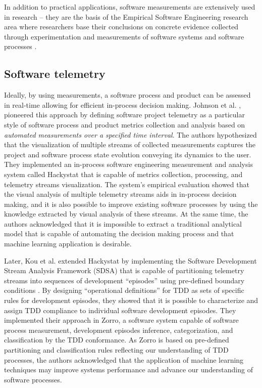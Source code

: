 In addition to practical applications, software measurements are extensively used in research --
they are the basis of the Empirical Software Engineering research area where researchers base their conclusions on 
concrete evidence collected through experimentation and measurements of software systems and software 
processes \cite{citeulike:766768}.

\subsection{Software telemetry}\label{section_software_telemetry}
Ideally, by using measurements, a software process and product can be assessed in real-time allowing for 
efficient in-process decision making.
Johnson et al. \cite{citeulike:557296}, pioneered this approach by defining software project telemetry as a 
particular style of software process and product metrics collection and analysis based on 
\textit{automated measurements over a specified time interval}. 
The authors hypothesized that the visualization of multiple streams of collected measurements
captures the project and software process state evolution conveying its dynamics to the user.
They implemented an in-process software engineering measurement and analysis system called Hackystat 
\cite{citeulike:12929227} that is capable of metrics collection, processing, and telemetry streams visualization. 
The system's empirical evaluation showed that the visual analysis of multiple telemetry streams aids 
in in-process decision making, and it is also possible to improve existing software processes by using 
the knowledge extracted by visual analysis of these streams. 
At the same time, the authors acknowledged that it is impossible to extract a traditional analytical 
model that is capable of automating the decision making process and that machine learning application is 
desirable.

Later, Kou et al. extended Hackystat by implementing the 
Software Development Stream Analysis Framework (SDSA) 
that is capable of partitioning telemetry streams into sequences of development ``episodes'' using 
pre-defined boundary conditions \cite{citeulike:6180831} \cite{citeulike:11538873}.
By designing ``operational definitions'' for TDD as sets of specific rules for 
development episodes, they showed that it is possible to characterize and assign TDD compliance to 
individual software development episodes.
They implemented their approach in Zorro, a software system capable of software process measurement, 
development episodes inference, categorization, and classification by the TDD conformance. 
As Zorro is based on pre-defined partitioning and classification rules reflecting our understanding of 
TDD processes, the authors acknowledged that the application of machine learning techniques may improve 
systems performance and advance our understanding of software processes.

